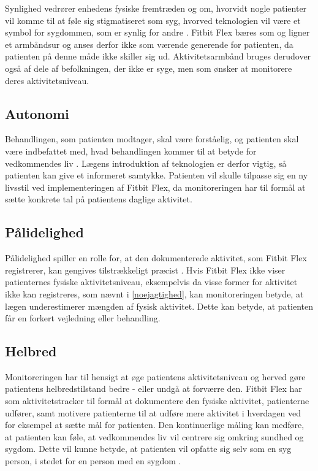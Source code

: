 Synlighed vedrører enhedens fysiske fremtræden og om, hvorvidt nogle patienter vil komme til at føle sig stigmatiseret som syg, hvorved teknologien vil være et symbol for sygdommen, som er synlig for andre \citep{Mittelstand2011}. Fitbit Flex bæres som og ligner et armbåndsur og anses derfor ikke som værende generende for patienten, da patienten på denne måde ikke skiller sig ud. Aktivitetsarmbånd bruges derudover også af dele af befolkningen, der ikke er syge, men som ønsker at monitorere deres aktivitetsniveau. 

\subsection{Autonomi}

Behandlingen, som patienten modtager, skal være forståelig, og patienten skal være indbefattet med, hvad behandlingen kommer til at betyde for vedkommendes liv \citep{Mittelstand2011}. Lægens introduktion af teknologien er derfor vigtig, så patienten kan give et informeret samtykke. Patienten vil skulle tilpasse sig en ny livsstil ved implementeringen af Fitbit Flex, da monitoreringen har til formål at sætte konkrete tal på patientens daglige aktivitet.

\subsection{Pålidelighed}

Pålidelighed spiller en rolle for, at den dokumenterede aktivitet, som Fitbit Flex registrerer, kan gengives tilstrækkeligt præcist \citep{Nordgren2013}.
Hvis Fitbit Flex ikke viser patienternes fysiske aktivitetsniveau, eksempelvis da visse former for aktivitet ikke kan registreres, som nævnt i \autoref{noejagtighed}, kan monitoreringen betyde, at lægen underestimerer mængden af fysisk aktivitet. Dette kan betyde, at patienten får en forkert vejledning eller behandling. 
 
\subsection{Helbred}

Monitoreringen har til hensigt at øge patientens aktivitetsniveau og herved gøre patientens helbredstilstand bedre - eller undgå at forværre den. Fitbit Flex har som aktivitetstracker til formål at dokumentere den fysiske aktivitet, patienterne udfører, samt motivere patienterne til at udføre mere aktivitet i hverdagen ved for eksempel at sætte mål for patienten. Den kontinuerlige måling kan medføre, at patienten kan føle, at vedkommendes liv vil centrere sig omkring sundhed og sygdom. Dette vil kunne betyde, at patienten vil opfatte sig selv som en syg person, i stedet for en person med en sygdom \citep{Nordgren2013}.

